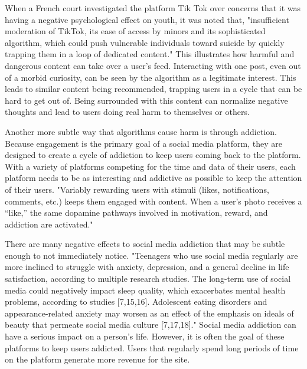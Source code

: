 \documentclass[conference]{IEEEtran}
\begin{document}
When a French court investigated the platform Tik Tok over concerns that it was having a negative psychological effect on youth, it was noted that, "insufficient moderation of TikTok, its ease of access by minors and its sophisticated algorithm, which could push vulnerable individuals toward suicide by quickly trapping them in a loop of dedicated content."\cite{Reuters2025_TikTokSuicide} This illustrates how harmful and dangerous content can take over a user's feed. Interacting with one post, even out of a morbid curiosity, can be seen by the algorithm as a legitimate interest. This leads to similar content being recommended, trapping users in a cycle that can be hard to get out of. Being surrounded with this content can normalize negative thoughts and lead to users doing real harm to themselves or others.

Another more subtle way that algorithms cause harm is through addiction. Because engagement is the primary goal of a social media platform, they are designed to create a cycle of addiction to keep users coming back to the platform. With a variety of platforms competing for the time and data of their users, each platform needs to be as interesting and addictive as possible to keep the attention of their users. "Variably rewarding users with stimuli (likes, notifications, comments, etc.) keeps them engaged with content. When a user’s photo receives a “like,” the same dopamine pathways involved in motivation, reward, and addiction are activated."\cite{Qiu2021_PsychiatristsAlgorithms}

There are many negative effects to social media addiction that may be subtle enough to not immediately notice. "Teenagers who use social media regularly are more inclined to struggle with anxiety, depression, and a general decline in life satisfaction, according to multiple research studies. The long-term use of social media could negatively impact sleep quality, which exacerbates mental health problems, according to studies [7,15,16]. Adolescent eating disorders and appearance-related anxiety may worsen as an effect of the emphasis on ideals of beauty that permeate social media culture [7,17,18]."\cite{Amirthalingam2024_SocialMediaAddiction} Social media addiction can have a serious impact on a person's life. However, it is often the goal of these platforms to keep users addicted. Users that regularly spend long periods of time on the platform generate more revenue for the site.
\end{document}
